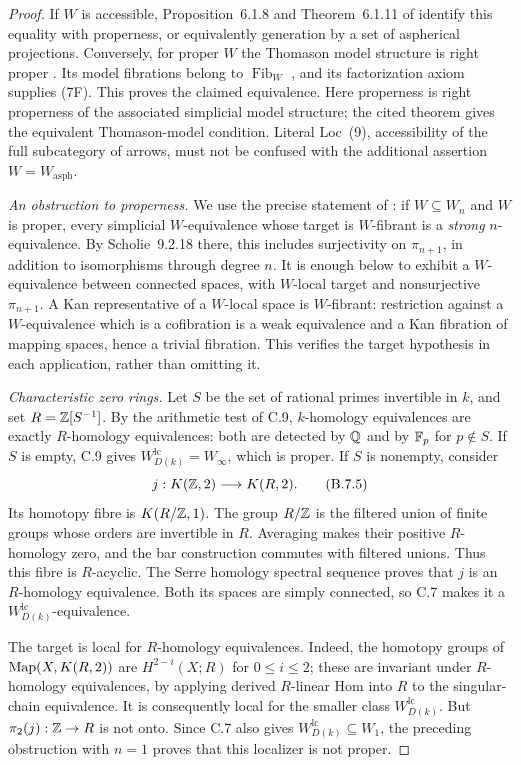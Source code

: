 \begin{proof}
If $W$ is accessible, Proposition~6.1.8 and
Theorem~6.1.11 of \citet{Cisinski2006} identify this
equality with properness, or equivalently generation
by a set of aspherical projections. Conversely, for
proper $W$ the Thomason model structure is right proper
\citep[Theorem~5.2.15]{Cisinski2006}. Its model
fibrations belong to $\operatorname{Fib}_W$
\citep[Example~6.1.14]{Cisinski2006}, and its
factorization axiom supplies (7F).
This proves the claimed equivalence.
Here properness is right properness of the associated
simplicial model structure; the cited theorem gives the
equivalent Thomason-model condition. Literal Loc~(9),
accessibility of the full subcategory of arrows, must not
be confused with the additional assertion
$W=W_{\mathrm{asph}}$.

\emph{An obstruction to properness.}
We use the precise statement of
\citet[Lemma~9.4.5]{Cisinski2006}: if $W\subseteq W_n$
and $W$ is proper, every simplicial $W$-equivalence
whose target is $W$-fibrant is a \emph{strong}
$n$-equivalence. By Scholie~9.2.18 there, this includes
surjectivity on $\pi_{n+1}$, in addition to isomorphisms
through degree $n$. It is enough below to exhibit a
$W$-equivalence between connected spaces, with
$W$-local target and nonsurjective $\pi_{n+1}$.
A Kan representative of a $W$-local space is
$W$-fibrant: restriction against a $W$-equivalence
which is a cofibration is a weak equivalence and a
Kan fibration of mapping spaces, hence a trivial
fibration. This verifies the target hypothesis in
each application, rather than omitting it.

\emph{Characteristic zero rings.}
Let $S$ be the set of rational primes invertible in
$k$, and set $R=\mathbb Z[S^{-1}]$. By the arithmetic test
of C.9, $k$-homology equivalences are exactly
$R$-homology equivalences: both are detected by
$\mathbb Q$ and by $\mathbb F_p$ for $p\notin S$.
If $S$ is empty, C.9 gives
$W_{D(k)}^{\mathrm{lc}}=W_\infty$, which is proper.
If $S$ is nonempty, consider
\[
 j:K(\mathbb Z,2)\longrightarrow K(R,2).
\tag{B.7.5}
\]
Its homotopy fibre is $K(R/\mathbb Z,1)$. The group $R/\mathbb Z$
is the filtered union of finite groups whose orders
are invertible in $R$. Averaging makes their positive
$R$-homology zero, and the bar construction commutes
with filtered unions. Thus this fibre is $R$-acyclic.
The Serre homology spectral sequence proves that $j$
is an $R$-homology equivalence. Both its spaces are
simply connected, so C.7 makes it a
$W_{D(k)}^{\mathrm{lc}}$-equivalence.

The target is local for $R$-homology equivalences.
Indeed, the homotopy groups of
$\operatorname{Map}(X,K(R,2))$ are $H^{2-i}(X;R)$ for $0\leq i\leq2$;
these are invariant under $R$-homology equivalences,
by applying derived $R$-linear Hom into $R$ to
the singular-chain equivalence. It is consequently
local for the smaller class $W_{D(k)}^{\mathrm{lc}}$.
But $\pi_2(j):\mathbb Z\to R$ is not onto. Since C.7
also gives $W_{D(k)}^{\mathrm{lc}}\subseteq W_1$,
the preceding obstruction with $n=1$ proves that
this localizer is not proper.


\end{proof}
